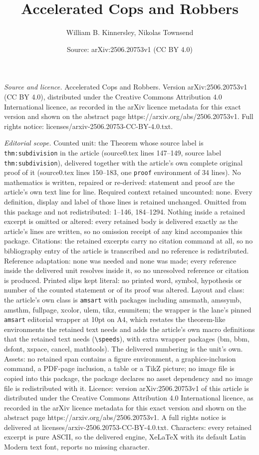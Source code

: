\documentclass[10pt,a4paper]{amsart}
\title[Accelerated Cops and Robbers]{Accelerated Cops and Robbers}
\author{William B. Kinnersley, Nikolas Townsend}
\date{Source: arXiv:2506.20753v1 (CC BY 4.0)}
\begin{document}
\maketitle

\noindent\emph{Source and licence.} Accelerated Cops and Robbers. Version arXiv:2506.20753v1 (CC BY 4.0), distributed under the Creative Commons Attribution 4.0 International licence, as recorded in the arXiv licence metadata for this exact version and shown on the abstract page https://arxiv.org/abs/2506.20753v1. Full rights notice: licenses/arxiv-2506.20753-CC-BY-4.0.txt.\par\smallskip

\noindent\textit{Editorial scope.} Counted unit: the Theorem whose source label is \texttt{thm:subdivision} in the article (source0.tex lines 147--149, source label \texttt{thm:subdivision}), delivered together with the article's own complete original proof of it (source0.tex lines 150--183, one \texttt{proof} environment of 34 lines). No mathematics is written, repaired or re-derived: statement and proof are the article's own text line for line. Required context retained uncounted: none. Every definition, display and label of those lines is retained unchanged. Omitted from this package and not redistributed: 1--146, 184--1294. Nothing inside a retained excerpt is omitted or altered: every retained body is delivered exactly as the article's lines are written, so no omission receipt of any kind accompanies this package. Citations: the retained excerpts carry no citation command at all, so no bibliography entry of the article is transcribed and no reference is redistributed. Reference adaptation: none was needed and none was made; every reference inside the delivered unit resolves inside it, so no unresolved reference or citation is produced. Printed slips kept literal: no printed word, symbol, hypothesis or number of the counted statement or of its proof was altered. Layout and class: the article's own class is \texttt{amsart} with packages including amsmath, amssymb, amsthm, fullpage, xcolor, ulem, tikz, enumitem; the wrapper is the lane's pinned \texttt{amsart} editorial wrapper at 10pt on A4, which restates the theorem-like environments the retained text needs and adds the article's own macro definitions that the retained text needs (\texttt{\textbackslash speeds}), with extra wrapper packages (bm, bbm, dsfont, xspace, cancel, mathtools). The delivered numbering is the unit's own. Assets: no retained span contains a figure environment, a graphics-inclusion command, a PDF-page inclusion, a table or a TikZ picture; no image file is copied into this package, the package declares no asset dependency and no image file is redistributed with it. Licence: version arXiv:2506.20753v1 of this article is distributed under the Creative Commons Attribution 4.0 International licence, as recorded in the arXiv licence metadata for this exact version and shown on the abstract page https://arxiv.org/abs/2506.20753v1. A full rights notice is delivered at licenses/arxiv-2506.20753-CC-BY-4.0.txt. Characters: every retained excerpt is pure ASCII, so the delivered engine, XeLaTeX with its default Latin Modern text font, reports no missing character.
\end{document}
